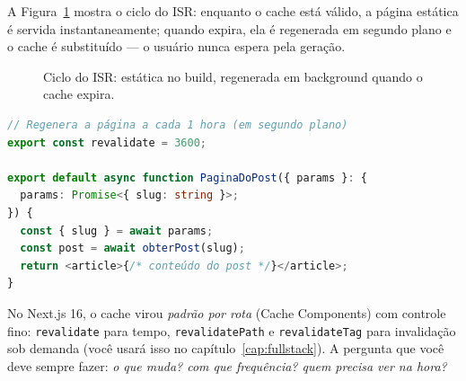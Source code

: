 A Figura~\ref{fig:isr-fluxo} mostra o ciclo do ISR: enquanto o cache está
válido, a página estática é servida instantaneamente; quando expira, ela é
regenerada em segundo plano e o cache é substituído — o usuário nunca espera
pela geração.

\begin{figure}[htbp]
  \centering
  \caption{Ciclo do ISR: estática no build, regenerada em background quando o
  cache expira.}
  \label{fig:isr-fluxo}
\end{figure}

\begin{lstlisting}[style=livro, language=TypeScript,
  caption={ISR: página estática que se atualiza.}, label={list:nextjs-isr}]
// Regenera a página a cada 1 hora (em segundo plano)
export const revalidate = 3600;

export default async function PaginaDoPost({ params }: {
  params: Promise<{ slug: string }>;
}) {
  const { slug } = await params;
  const post = await obterPost(slug);
  return <article>{/* conteúdo do post */}</article>;
}
\end{lstlisting}

\begin{caixaconceito}
No Next.js 16, o cache virou \emph{padrão por rota} (Cache Components) com
controle fino: \texttt{revalidate} para tempo, \texttt{revalidatePath} e
\texttt{revalidateTag} para invalidação sob demanda (você usará isso no
capítulo~\ref{cap:fullstack}). A pergunta que você deve sempre fazer: \emph{o
que muda? com que frequência? quem precisa ver na hora?}
\end{caixaconceito}

